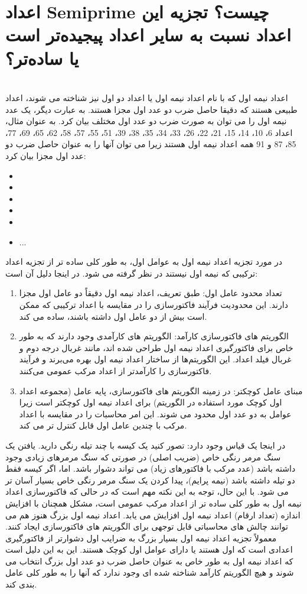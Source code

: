 \documentclass{article}
\begin{document}
\section{اعداد Semiprime چیست؟ تجزیه این اعداد نسبت به سایر اعداد پیجیده‌تر است یا ساده‌تر؟}
\leavevmode
\\
اعداد نیمه اول که با نام اعداد نیمه اول یا اعداد دو اول نیز شناخته می شوند، اعداد طبیعی هستند که دقیقا حاصل ضرب دو عدد اول مجزا هستند. به عبارت دیگر، یک عدد نیمه اول را می توان به صورت ضرب دو عدد اول مختلف بیان کرد.
به عنوان مثال، اعداد 6، 10، 14، 15، 21، 22، 26، 33، 34، 35، 38، 39، 51، 55، 57، 58، 62، 65، 69، 77، 85، 87 و 91 همه اعداد نیمه اول هستند زیرا می توان آنها را به عنوان حاصل ضرب دو عدد اول مجزا بیان کرد:
\begin{itemize}
\item {}
\item {}
\item {}
\item {}
\item {}
\item ...
\end{itemize}
در مورد تجزیه اعداد نیمه اول به عوامل اول، به طور کلی ساده تر از تجزیه اعداد ترکیبی که نیمه اول نیستند در نظر گرفته می شود.
در اینجا دلیل آن است:
\begin{enumerate}
\item تعداد محدود عامل اول: طبق تعریف، اعداد نیمه اول دقیقاً دو عامل اول مجزا دارند. این محدودیت فرآیند فاکتورسازی را در مقایسه با اعداد ترکیبی که ممکن است بیش از دو عامل اول داشته باشند، ساده می کند.
\item الگوریتم های فاکتورسازی کارآمد: الگوریتم های کارآمدی وجود دارند که به طور خاص برای فاکتورگیری اعداد نیمه اول طراحی شده اند، مانند غربال درجه دوم و غربال فیلد اعداد. این الگوریتم‌ها از ساختار اعداد نیمه اول بهره می‌برند و فرآیند فاکتورسازی را کارآمدتر از اعداد مرکب عمومی می‌کنند.
\item مبنای عامل کوچکتر: در زمینه الگوریتم های فاکتورسازی، پایه عامل (مجموعه اعداد اول کوچک مورد استفاده در الگوریتم) برای اعداد نیمه اول کوچکتر است زیرا عوامل به دو عدد اول محدود می شوند. این امر محاسبات را در مقایسه با اعداد مرکب با چندین عامل اول قابل کنترل تر می کند.
\end{enumerate}
در اینجا یک قیاس وجود دارد: تصور کنید یک کیسه با چند تیله رنگی دارید. یافتن یک سنگ مرمر رنگی خاص (ضریب اصلی) در صورتی که سنگ مرمرهای زیادی وجود داشته باشد (عدد مرکب با فاکتورهای زیاد) می تواند دشوار باشد. اما، اگر کیسه فقط دو تیله داشته باشد (نیمه پرایم)، پیدا کردن یک سنگ مرمر رنگی خاص بسیار آسان تر می شود.
با این حال، توجه به این نکته مهم است که در حالی که فاکتورسازی اعداد نیمه اول به طور کلی ساده تر از اعداد مرکب عمومی است، مشکل همچنان با افزایش اندازه (تعداد ارقام) اعداد نیمه اول افزایش می یابد. اعداد نیمه اول بزرگ هنوز هم می توانند چالش های محاسباتی قابل توجهی برای الگوریتم های فاکتورسازی ایجاد کنند.
معمولاً تجزیه اعداد نیمه اول بسیار بزرگ به ضرایب اول دشوارتر از فاکتورگیری اعدادی است که اول هستند یا دارای عوامل اول کوچک هستند. این به این دلیل است که اعداد نیمه اول به طور خاص به عنوان حاصل ضرب دو عدد اول بزرگ انتخاب می شوند و هیچ الگوریتم کارآمد شناخته شده ای وجود ندارد که آنها را به طور کلی عامل بندی کند.
\end{document}

